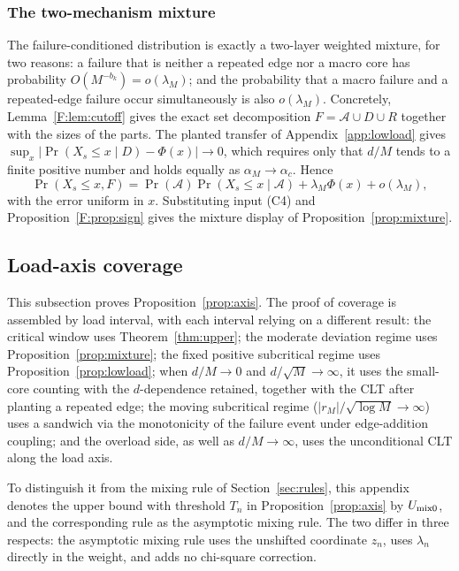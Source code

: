 \subsubsection{The two-mechanism mixture}

The failure-conditioned distribution is exactly a two-layer weighted mixture, for two reasons: a
failure that is neither a repeated edge nor a macro core has probability
$O(M^{-b_k})=o(\lambda_M)$; and the probability that a macro failure and a repeated-edge failure
occur simultaneously is also $o(\lambda_M)$. Concretely, Lemma~\ref{F:lem:cutoff} gives the exact
set decomposition $F=\mathcal A\cup D\cup R$ together with the sizes of the parts. The planted
transfer of Appendix~\ref{app:lowload} gives
$\sup_x|\Pr(X_s\le x\mid D)-\Phi(x)|\to0$, which requires only that $d/M$ tends to a finite
positive number and holds equally as $\alpha_M\to\alpha_c$. Hence
\[
\Pr(X_s\le x,F)=\Pr(\mathcal A)\Pr(X_s\le x\mid \mathcal A)+\lambda_M\Phi(x)+o(\lambda_M),
\]
with the error uniform in $x$. Substituting input (C4) and Proposition~\ref{F:prop:sign} gives
the mixture display of Proposition~\ref{prop:mixture}.

\subsection{Load-axis coverage}\label{app:axis}
This subsection proves Proposition~\ref{prop:axis}. The proof of coverage is assembled by load
interval, with each interval relying on a different result: the critical window uses
Theorem~\ref{thm:upper}; the moderate deviation regime uses Proposition~\ref{prop:mixture}; the
fixed positive subcritical regime uses Proposition~\ref{prop:lowload}; when $d/M\to0$ and
$d/\sqrt M\to\infty$, it uses the small-core counting with the $d$-dependence retained, together
with the CLT after planting a repeated edge; the moving subcritical regime
($|r_M|/\sqrt{\log M}\to\infty$) uses a sandwich via the monotonicity of the failure event under
edge-addition coupling; and the overload side, as well as $d/M\to\infty$, uses the unconditional
CLT along the load axis.

To distinguish it from the mixing rule of Section~\ref{sec:rules}, this appendix denotes the upper
bound with threshold $T_n$ in Proposition~\ref{prop:axis} by $U_{\rm mix0}$, and the
corresponding rule as the asymptotic mixing rule. The two differ in three respects: the asymptotic
mixing rule uses the unshifted coordinate $z_n$, uses $\lambda_n$ directly in the weight, and adds
no chi-square correction.


